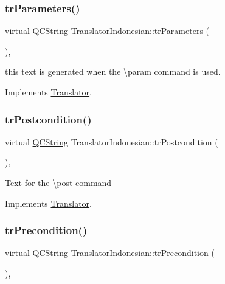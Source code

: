 \subsubsection{\texorpdfstring{trParameters()}{trParameters()}}
{\footnotesize\ttfamily virtual \mbox{\hyperlink{class_q_c_string}{Q\+C\+String}} Translator\+Indonesian\+::tr\+Parameters (\begin{DoxyParamCaption}{ }\end{DoxyParamCaption})\hspace{0.3cm}{\ttfamily [inline]}, {\ttfamily [virtual]}}

this text is generated when the \textbackslash{}param command is used. 

Implements \mbox{\hyperlink{class_translator}{Translator}}.

\mbox{\label{class_translator_indonesian_a20c0409995a726ae08ea7906891c4ca9}} 
\subsubsection{\texorpdfstring{trPostcondition()}{trPostcondition()}}
{\footnotesize\ttfamily virtual \mbox{\hyperlink{class_q_c_string}{Q\+C\+String}} Translator\+Indonesian\+::tr\+Postcondition (\begin{DoxyParamCaption}{ }\end{DoxyParamCaption})\hspace{0.3cm}{\ttfamily [inline]}, {\ttfamily [virtual]}}

Text for the \textbackslash{}post command 

Implements \mbox{\hyperlink{class_translator}{Translator}}.

\mbox{\label{class_translator_indonesian_ad0b686e6e688df5853e7ad7370b1adff}} 
\subsubsection{\texorpdfstring{trPrecondition()}{trPrecondition()}}
{\footnotesize\ttfamily virtual \mbox{\hyperlink{class_q_c_string}{Q\+C\+String}} Translator\+Indonesian\+::tr\+Precondition (\begin{DoxyParamCaption}{ }\end{DoxyParamCaption})\hspace{0.3cm}{\ttfamily [inline]}, {\ttfamily [virtual]}}

